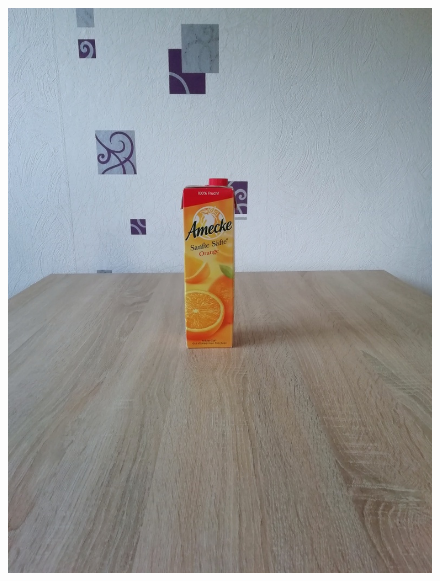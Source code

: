 \begin{appendices}
\begin{figure}[htb]
\begin{minipage}[c]{0.2\textwidth}
\includegraphics[width=\textwidth]{Sources/Bild1_GW.jpg}
\end{minipage}
\hfill
\begin{minipage}[c]{0.08\textwidth}

\end{minipage}
\end{figure}
\end{appendices}
